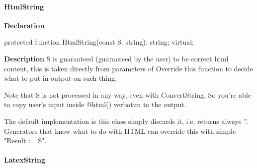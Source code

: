 \documentclass{report}
\newif\ifpdf
\begin{document}
\paragraph*{HtmlString}\hspace*{\fill}

\label{PasDoc_Gen.TDocGenerator-HtmlString}
\begin{list}{}{
\setlength{\itemindent}{0cm}
\setlength{\listparindent}{0cm}
\setlength{\leftmargin}{\evensidemargin}
\addtolength{\leftmargin}{\tmplength}
\settowidth{\labelsep}{X}
\addtolength{\leftmargin}{\labelsep}
\setlength{\labelwidth}{\tmplength}
}
\item[\textbf{Declaration}\hfill]
\ifpdf
\begin{flushleft}
\fi
\begin{ttfamily}
protected function HtmlString(const S: string): string; virtual;\end{ttfamily}

\ifpdf
\end{flushleft}
\fi

\par
\item[\textbf{Description}]
S is guaranteed (guaranteed by the user) to be correct html content, this is taken directly from parameters of  Override this function to decide what to put in output on such thing.

Note that S is not processed in any way, even with ConvertString. So you're able to copy user's input inside @html() verbatim to the output.

The default implementation is this class simply discards it, i.e. returns always ''. Generators that know what to do with HTML can override this with simple "Result := S".

\end{list}
\paragraph*{LatexString}\hspace*{\fill}
\end{document}
